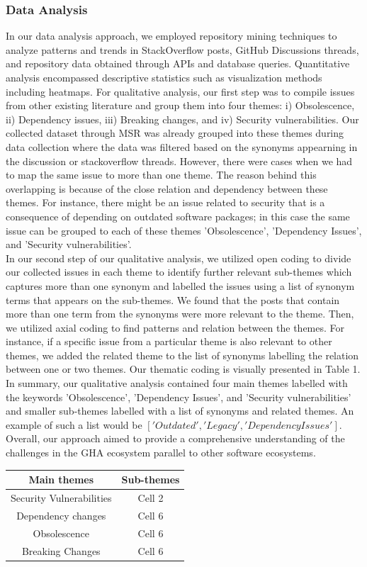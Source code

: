 \documentclass[conference]{IEEEtran}
\begin{document}
            \subsubsection{\textbf{Data Analysis}}
                In our data analysis approach, we employed repository mining techniques to analyze patterns and trends in StackOverflow posts, GitHub Discussions threads, and repository data obtained through APIs and database queries. Quantitative analysis encompassed descriptive statistics such as visualization methods including heatmaps. For qualitative analysis, our first step was to compile issues from other existing literature and group them into four themes: i) Obsolescence, ii) Dependency issues, iii) Breaking changes, and iv) Security vulnerabilities. Our collected dataset through MSR was already grouped into these themes during data collection where the data was filtered based on the synonyms appearning in the discussion or stackoverflow threads. However, there were cases when we had to map the same issue to more than one theme. The reason behind this overlapping is because of the close relation and dependency between these themes. For instance, there might be an issue related to security that is a consequence of depending on outdated software packages; in this case the same issue can be grouped to each of these themes 'Obsolescence', 'Dependency Issues', and 'Security vulnerabilities'. \\
                In our second step of our qualitative analysis, we utilized open coding to divide our collected issues in each theme to identify further relevant sub-themes which captures more than one synonym and labelled the issues using a list of synonym terms that appears on the sub-themes. We found that the posts that contain more than one term from the synonyms were more relevant to the theme. Then, we utilized axial coding to find patterns and relation between the themes. For instance, if a specific issue from a particular theme is also relevant to other themes,  we added the related theme to the list of synonyms labelling the relation between one or two themes. Our thematic coding is visually presented in Table 1.\\
                In summary, our qualitative analysis contained four main themes labelled with the keywords  'Obsolescence', 'Dependency Issues', and 'Security vulnerabilities' and smaller sub-themes labelled with a list of synonyms and related themes. An example of such a list would be $['Outdated', 'Legacy', 'Dependency Issues' ]$. Overall, our approach aimed to provide a comprehensive understanding of the challenges in the GHA ecosystem parallel to other software ecosystems.\\
\begin{tabular}{|c|c|}
  \hline
  \textbf{Main themes} & \textbf{Sub-themes} \\
  \hline
  \hline
    Security Vulnerabilities & Cell 2  \\
  \hline
   Dependency changes & Cell 6 \\
  \hline
  \hline
   Obsolescence & Cell 6 \\
  \hline
  \hline
   Breaking Changes & Cell 6 \\
  \hline
\end{tabular}
\end{document}
